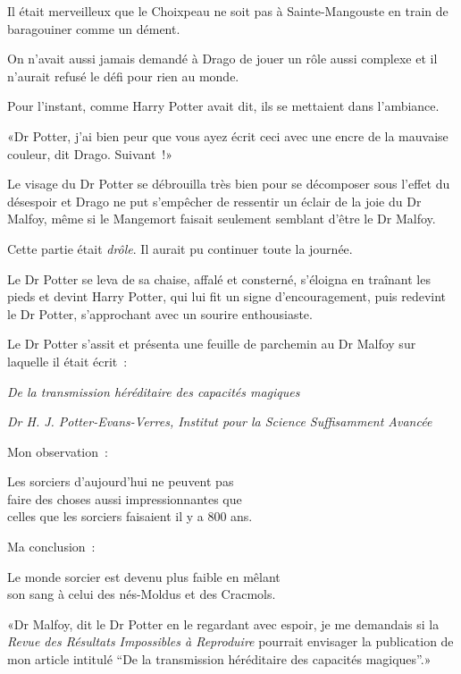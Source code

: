 Il était merveilleux que le Choixpeau ne soit pas à Sainte-Mangouste en train de baragouiner comme un dément.

On n'avait aussi jamais demandé à Drago de jouer un rôle aussi complexe et il n'aurait refusé le défi pour rien au monde.

Pour l'instant, comme Harry Potter avait dit, ils se mettaient dans l'ambiance.

«Dr Potter, j'ai bien peur que vous ayez écrit ceci avec une encre de la mauvaise couleur, dit Drago. Suivant~!»

Le visage du Dr Potter se débrouilla très bien pour se décomposer sous l'effet du désespoir et Drago ne put s'empêcher de ressentir un éclair de la joie du Dr Malfoy, même si le Mangemort faisait seulement semblant d'être le Dr Malfoy.

Cette partie était \emph{drôle}. Il aurait pu continuer toute la journée.

Le Dr Potter se leva de sa chaise, affalé et consterné, s'éloigna en traînant les pieds et devint Harry Potter, qui lui fit un signe d'encouragement, puis redevint le Dr Potter, s'approchant avec un sourire enthousiaste.

Le Dr Potter s'assit et présenta une feuille de parchemin au Dr Malfoy sur laquelle il était écrit~:
\begin{center}
\emph{De la transmission héréditaire des capacités magiques}

\emph{Dr H. J. Potter-Evans-Verres, Institut pour la Science Suffisamment Avancée} \end{center}

\begin{writtenNote}
Mon observation~:

Les sorciers d'aujourd'hui ne peuvent pas\\
faire des choses aussi impressionnantes que\\
celles que les sorciers faisaient il y a 800 ans.

Ma conclusion~:

Le monde sorcier est devenu plus faible en mêlant\\
son sang à celui des nés-Moldus et des Cracmols.
\end{writtenNote}

«Dr Malfoy, dit le Dr Potter en le regardant avec espoir, je me demandais si la \emph{Revue des Résultats Impossibles à Reproduire} pourrait envisager la publication de mon article intitulé “De la transmission héréditaire des capacités magiques”.»

